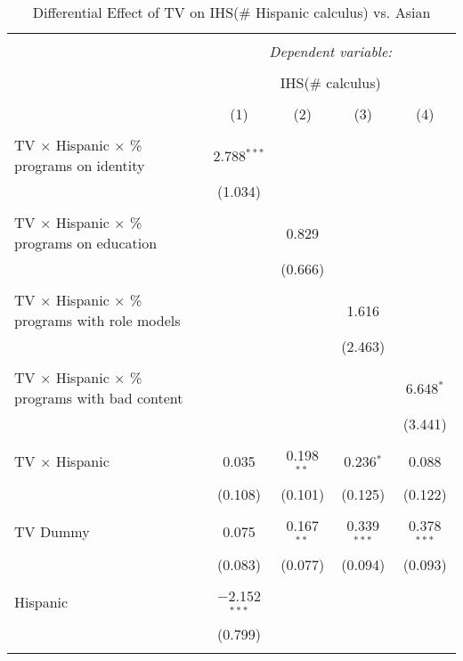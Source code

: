 
\begin{table}[!htbp] \centering 
  \caption{Differential Effect of TV on IHS(\# Hispanic calculus) vs. Asian} 
  \label{} 
\begin{tabular}{@{\extracolsep{-2pt}}lcccc} 
\\[-1.8ex]\hline 
\hline \\[-1.8ex] 
 & \multicolumn{4}{c}{\textit{Dependent variable:}} \\ 
\cline{2-5} 
\\[-1.8ex] & \multicolumn{4}{c}{IHS(\# calculus)} \\ 
\\[-1.8ex] & (1) & (2) & (3) & (4)\\ 
\hline \\[-1.8ex] 
 TV $\times$ Hispanic $\times$ \% programs on identity & 2.788$^{***}$ &  &  &  \\ 
  & (1.034) &  &  &  \\ 
  & & & & \\ 
 TV $\times$ Hispanic $\times$ \% programs on education &  & 0.829 &  &  \\ 
  &  & (0.666) &  &  \\ 
  & & & & \\ 
 TV $\times$ Hispanic $\times$ \% programs with role models &  &  & 1.616 &  \\ 
  &  &  & (2.463) &  \\ 
  & & & & \\ 
 TV $\times$ Hispanic $\times$ \% programs with bad content &  &  &  & 6.648$^{*}$ \\ 
  &  &  &  & (3.441) \\ 
  & & & & \\ 
 TV $\times$ Hispanic & 0.035 & 0.198$^{**}$ & 0.236$^{*}$ & 0.088 \\ 
  & (0.108) & (0.101) & (0.125) & (0.122) \\ 
  & & & & \\ 
 TV Dummy & 0.075 & 0.167$^{**}$ & 0.339$^{***}$ & 0.378$^{***}$ \\ 
  & (0.083) & (0.077) & (0.094) & (0.093) \\ 
  & & & & \\ 
 Hispanic & $-$2.152$^{***}$ &  &  &  \\ 
  & (0.799) &  &  &  \\ 
  & & & & \\ 

\end{tabular}
\end{table}
